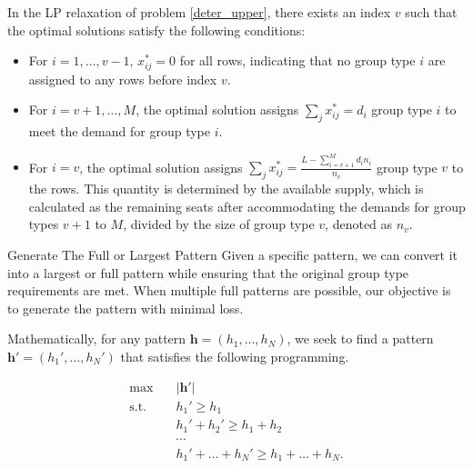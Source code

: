   \begin{frame}
    In the LP relaxation of problem \eqref{deter_upper}, there exists an index $v$ such that the optimal solutions satisfy the following conditions:

    \begin{itemize}
      \item For $i = 1,\ldots, v-1$, $x_{ij}^{*} = 0$ for all rows, indicating that no group type $i$ are assigned to any rows before index $v$.
      \item For $i = v+1,\ldots, M$, the optimal solution assigns $\sum_{j} x_{ij}^{*} = d_{i}$ group type $i$ to meet the demand for group type $i$.
      \item For $i = v$, the optimal solution assigns $\sum_{j} x_{ij}^{*} = \frac{L - \sum_{i = v+1}^{M} {d_i n_i}}{n_v}$ group type $v$ to the rows. This quantity is determined by the available supply, which is calculated as the remaining seats after accommodating the demands for group types $v+1$ to $M$, divided by the size of group type $v$, denoted as $n_v$.
    \end{itemize}
  \end{frame}

  \begin{frame}{Generate The Full or Largest Pattern}
    Given a specific pattern, we can convert it into a largest or full pattern while ensuring that the
    original group type requirements are met. When multiple full patterns are possible, our objective is to generate the pattern with minimal loss.

    Mathematically, for any pattern $\bm{h} = (h_1, \ldots, h_N)$, we seek to find a pattern $\bm{h}{'} = (h_1{'}, \ldots, h_N{'})$ that satisfies the following programming.

    \begin{equation}\label{full_largest}
      \begin{aligned}
      \max \quad & |\bm{h}{'}| \\
      \text {s.t.} \quad & h_1{'} \geq h_1 \\
      &  h_1{'} + h_2{'} \geq h_1 + h_2 \\
      & \cdots \\
      & h_1{'} + \ldots + h_N{'} \geq h_1 + \ldots + h_N.
      \end{aligned}
    \end{equation}
  \end{frame}
